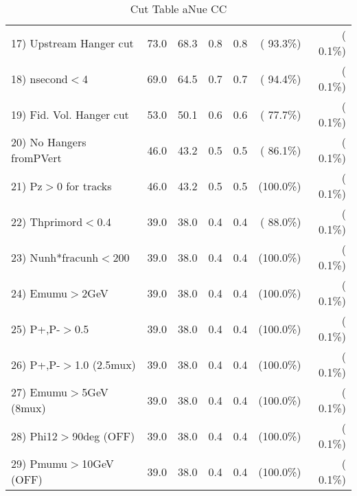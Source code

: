 \begin{table}[h!]
\begin{tabular}{||l||r|r|r|r|r|r||}
 17) Upstream Hanger cut  &         73.0 &         68.3 &          0.8 &          0.8 & ( 93.3\%) & (  0.1\%) \\
 18) nsecond$<$4          &         69.0 &         64.5 &          0.7 &          0.7 & ( 94.4\%) & (  0.1\%) \\
 19) Fid. Vol. Hanger cut &         53.0 &         50.1 &          0.6 &          0.6 & ( 77.7\%) & (  0.1\%) \\
 20) No Hangers fromPVert &         46.0 &         43.2 &          0.5 &          0.5 & ( 86.1\%) & (  0.1\%) \\
 21) Pz$>$0 for tracks    &         46.0 &         43.2 &          0.5 &          0.5 & (100.0\%) & (  0.1\%) \\
 22) Thprimord$<$0.4      &         39.0 &         38.0 &          0.4 &          0.4 & ( 88.0\%) & (  0.1\%) \\
 23) Nunh*fracunh$<$200   &         39.0 &         38.0 &          0.4 &          0.4 & (100.0\%) & (  0.1\%) \\
 24) Emumu$>$2GeV         &         39.0 &         38.0 &          0.4 &          0.4 & (100.0\%) & (  0.1\%) \\
 25) P+,P-$>$0.5          &         39.0 &         38.0 &          0.4 &          0.4 & (100.0\%) & (  0.1\%) \\
 26) P+,P-$>$1.0 (2.5mux) &         39.0 &         38.0 &          0.4 &          0.4 & (100.0\%) & (  0.1\%) \\
 27) Emumu$>$5GeV  (8mux) &         39.0 &         38.0 &          0.4 &          0.4 & (100.0\%) & (  0.1\%) \\
 28) Phi12$>$90deg  (OFF) &         39.0 &         38.0 &          0.4 &          0.4 & (100.0\%) & (  0.1\%) \\
 29) Pmumu$>$10GeV  (OFF) &         39.0 &         38.0 &          0.4 &          0.4 & (100.0\%) & (  0.1\%) \\
 \hline
 \hline
 \end{tabular}
 \caption{Cut Table  aNue CC  }
 \label{tab-cutcohjpsi-mumu_anuecc}
 \end{table}
